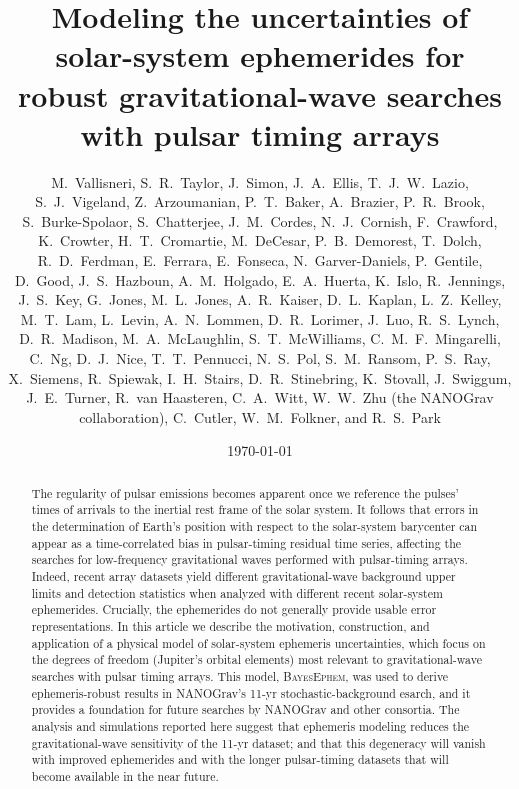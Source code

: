 \documentclass[reprint,
 amsmath,amssymb,
 aps,prd,floatfix,
]{revtex4-1}
\begin{document}

\title{Modeling the uncertainties of solar-system ephemerides for robust gravitational-wave searches with pulsar timing arrays}

\author{M.~Vallisneri, S.~R.~Taylor, J.~Simon, J.~A.~Ellis, T.~J.~W.~Lazio, S.~J.~Vigeland, Z.~Arzoumanian, P.~T.~Baker, A.~Brazier, P.~R.~Brook, S.~Burke-Spolaor, S.~Chatterjee, J.~M.~Cordes, N.~J.~Cornish, F.~Crawford, K.~Crowter, H.~T.~Cromartie, M.~DeCesar, P.~B.~Demorest, T.~Dolch, R.~D.~Ferdman, E.~Ferrara, E.~Fonseca, N.~Garver-Daniels, P.~Gentile, D.~Good, J.~S.~Hazboun, A.~M.~Holgado, E.~A.~Huerta, K.~Islo, R.~Jennings, J.~S.~Key, G.~Jones, M.~L.~Jones, A.~R.~Kaiser, D.~L.~Kaplan, L.~Z.~Kelley, M.~T.~Lam, L.~Levin, A.~N.~Lommen, D.~R.~Lorimer, J.~Luo, R.~S.~Lynch, D.~R.~Madison, M.~A.~McLaughlin, S.~T.~McWilliams, C.~M.~F.~Mingarelli, C.~Ng, D.~J.~Nice, T.~T.~Pennucci, N.~S.~Pol, S.~M.~Ransom, P.~S.~Ray, X.~Siemens, R.~Spiewak, I.~H.~Stairs, D.~R.~Stinebring, K.~Stovall, J.~Swiggum, J.~E.~Turner, R.~van Haasteren, C.~A.~Witt, W.~W.~Zhu (the NANOGrav collaboration), C.~Cutler, W.~M.~Folkner, and R.~S.~Park}


\date{\today}

\begin{abstract}
The regularity of pulsar emissions becomes apparent once we reference the pulses' times of arrivals to the inertial rest frame of the solar system. It follows that errors in the determination of Earth's position with respect to the solar-system barycenter can appear as a time-correlated bias in pulsar-timing residual time series, affecting the searches for low-frequency gravitational waves performed with pulsar-timing arrays.
Indeed, recent array datasets yield different gravitational-wave background upper limits and detection statistics when analyzed with different recent solar-system ephemerides. Crucially, the ephemerides do not generally provide usable error representations.
In this article we describe the motivation, construction, and application of a physical model of solar-system ephemeris uncertainties, which focus on the degrees of freedom (Jupiter's orbital elements) most relevant to gravitational-wave searches with pulsar timing arrays.
This model, \textsc{BayesEphem}, was used to derive ephemeris-robust results in NANOGrav's 11-yr stochastic-background esarch, and it provides a foundation for future searches by NANOGrav and other consortia.
The analysis and simulations reported here suggest that ephemeris modeling reduces the gravitational-wave sensitivity of the 11-yr dataset; and that this degeneracy will vanish with improved ephemerides and with the longer pulsar-timing datasets that will become available in the near future.
\end{abstract}
\end{document}
